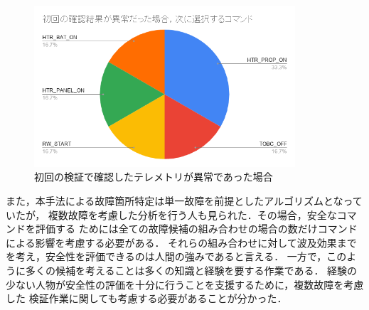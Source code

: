 \documentclass[11pt]{jsreport}
\begin{document}
\begin{figure}[H]
   \centering
      \includegraphics[height=6.0cm]{figure/second_selection.png}
      \caption{初回の検証で確認したテレメトリが異常であった場合}
      \label{fig:second_selection}
\end{figure}

また，本手法による故障箇所特定は単一故障を前提としたアルゴリズムとなっていたが，
複数故障を考慮した分析を行う人も見られた．その場合，安全なコマンドを評価する
ためには全ての故障候補の組み合わせの場合の数だけコマンドによる影響を考慮する必要がある．
それらの組み合わせに対して波及効果までを考え，安全性を評価できるのは人間の強みであると言える．
一方で，このように多くの候補を考えることは多くの知識と経験を要する作業である．
経験の少ない人物が安全性の評価を十分に行うことを支援するために，複数故障を考慮した
検証作業に関しても考慮する必要があることが分かった．

\newpage
\end{document}
